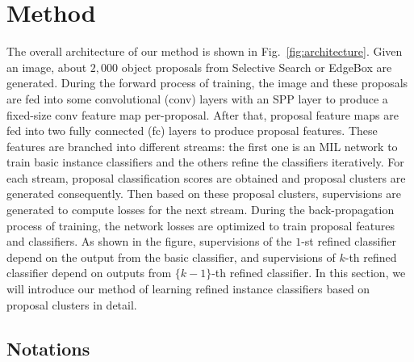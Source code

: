 \documentclass[10pt,journal,compsoc]{IEEEtran}
\begin{document}
\section{Method}
\label{sec:method}

The overall architecture of our method is shown in Fig.~\ref{fig:architecture}.
Given an image, about $2,000$ object proposals from Selective Search \cite{Ref:Uijlings2013} or EdgeBox \cite{Ref:Zitnick2014} are generated.
{During the forward process of training,
the image and these proposals are fed into some convolutional (conv) layers with an SPP layer \cite{Ref:He2015} to produce a fixed-size conv feature map per-proposal.
After that, proposal feature maps are fed into two fully connected (fc) layers to produce proposal features.
These features are branched into different streams:
the first one is an MIL network to train basic instance classifiers and the others refine the classifiers iteratively.
For each stream, proposal classification scores are obtained and proposal clusters are generated consequently.
Then based on these proposal clusters,
supervisions are generated to compute losses for the next stream.
During the back-propagation process of training,
the network losses are optimized to train proposal features and classifiers.}
As shown in the figure, supervisions of the $1$-st refined classifier depend on the output from the basic classifier,
and supervisions of $k$-th refined classifier depend on outputs from $\{k-1\}$-th refined classifier.
In this section, we will introduce our method of learning refined instance classifiers based on proposal clusters in detail.





\subsection{Notations}
\label{sec:notation}
\end{document}
